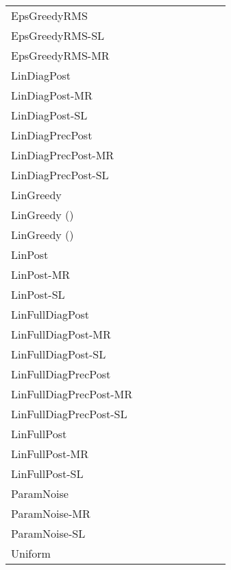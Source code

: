 \documentclass{article} \usepackage{iclr2018_conference,times}
\begin{document}
\begin{landscape}
\begin{table}[ht]
\begin{adjustbox}{center}
\begin{tabular}{lllllllll}
EpsGreedyRMS & & & & & & & &  \\
EpsGreedyRMS-SL & & & & & & & &  \\
EpsGreedyRMS-MR & & & & & & & &  \\
LinDiagPost & & & & & \bm{}& & &  \\
LinDiagPost-MR & & & & & & & &  \\
LinDiagPost-SL & & & & & & & &  \\
LinDiagPrecPost & & & & & \bm{}& & &  \\
LinDiagPrecPost-MR & & & & & \bm{}& & &  \\
LinDiagPrecPost-SL & & & & \bm{}& \bm{}& \bm{}& &  \\
LinGreedy & & & & & \bm{}& & \bm{}& \bm{} \\
LinGreedy () & & & & & & & &  \\
LinGreedy () & & & & & & & &  \\
LinPost & & & & & \bm{}& & &  \\
LinPost-MR & & & & & \bm{}& & &  \\
LinPost-SL & & & & & & & &  \\
LinFullDiagPost & & & & & & & &  \\
LinFullDiagPost-MR & & & & & & & &  \\
LinFullDiagPost-SL & & & & & & & &  \\
LinFullDiagPrecPost & & & & & & & &  \\
LinFullDiagPrecPost-MR & & & & & & & &  \\
LinFullDiagPrecPost-SL & & & & & & & &  \\
LinFullPost & & & & & & & &  \\
LinFullPost-MR & \bm{}& & & & & & &  \\
LinFullPost-SL & & & & & & & &  \\
ParamNoise & & & & & & & &  \\
ParamNoise-MR & & & & & & & &  \\
ParamNoise-SL & & & & & & & &  \\
Uniform & & & & & & & &  \\
\bottomrule
\end{tabular}
 	\end{adjustbox}
	\vspace*{\fill}
\end{table}
\end{landscape}
\end{document}
